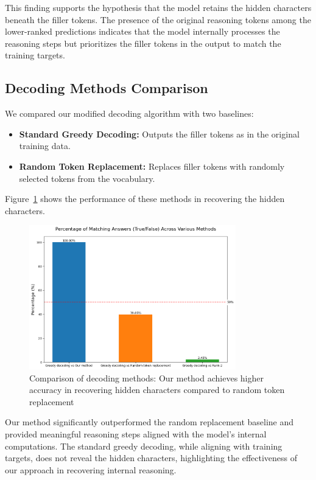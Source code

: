 \documentclass{article}
\begin{document}
This finding supports the hypothesis that the model retains the hidden characters beneath the filler tokens. The presence of the original reasoning tokens among the lower-ranked predictions indicates that the model internally processes the reasoning steps but prioritizes the filler tokens in the output to match the training targets.

\subsection{Decoding Methods Comparison}

We compared our modified decoding algorithm with two baselines:

\begin{itemize}
    \item \textbf{Standard Greedy Decoding:} Outputs the filler tokens as in the original training data.
    \item \textbf{Random Token Replacement:} Replaces filler tokens with randomly selected tokens from the vocabulary.
\end{itemize}

Figure~\ref{fig:token_comparison} shows the performance of these methods in recovering the hidden characters.

\begin{figure}[H]
\centering
\includegraphics[width=0.8\textwidth]{token_comparison_percentages.png}
\caption{Comparison of decoding methods: Our method achieves higher accuracy in recovering hidden characters compared to random token replacement}
\label{fig:token_comparison}
\end{figure}

Our method significantly outperformed the random replacement baseline and provided meaningful reasoning steps aligned with the model's internal computations. The standard greedy decoding, while aligning with training targets, does not reveal the hidden characters, highlighting the effectiveness of our approach in recovering internal reasoning.
\end{document}
